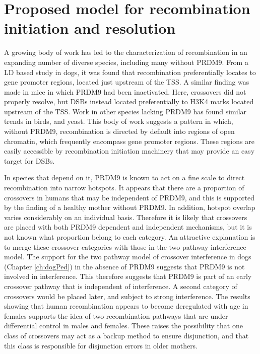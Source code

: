 \section{Proposed model for recombination initiation and resolution}

A growing body of work has led to the characterization of recombination in an expanding number of diverse species, including many without PRDM9.
From a LD based study in dogs, it was found that recombination preferentially locates to gene promoter regions, located just upstream of the TSS\cite{Auton2013}.
A similar finding was made in mice in which PRDM9 had been inactivated\cite{Brick2012}.
Here, crossovers did not properly resolve, but DSBs instead located preferentially to H3K4 marks located upstream of the TSS.
Work in other species lacking PRDM9 has found similar trends in birds\cite{Singhal2015}, and yeast\cite{Lam2015,Nicolas1989}.
This body of work suggests a pattern in which, without PRDM9, recombination is directed by default into regions of open chromatin, which frequently encompass gene promoter regions.
These regions are easily accessible by recombination initiation machinery that may provide an easy target for DSBs.

In species that depend on it, PRDM9 is known to act on a fine scale to direct recombination into narrow hotspots.
It appears that there are a proportion of crossovers in humans that may be independent of PRDM9, and this is supported by the finding of a healthy mother without PRDM9\cite{Narasimhan2016}.
In addition, hotspot overlap varies considerably on an individual basis\cite{Coop2008,Campbell2015}.
Therefore it is likely that crossovers are placed with both PRDM9 dependent and independent mechanisms, but it is not known what proportion belong to each category.
An attractive explanation is to merge these crossover categories with those in the two pathway interference model.
The support for the two pathway model of crossover interference in dogs (Chapter \ref{ch:dogPed}) in the absence of PRDM9 suggests that PRDM9 is not involved in interference.
This therefore suggests that PRDM9 is part of an early crossover pathway that is independent of interference.
A second category of crossovers would be placed later, and subject to strong interference.
The results showing that human recombination appears to become deregulated with age in females supports the idea of two recombination pathways that are under differential control in males and females.
These raises the possibility that one class of crossovers may act as a backup method to ensure disjunction, and that this class is responsible for disjunction errors in older mothers.

